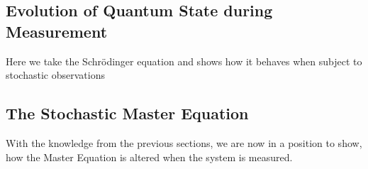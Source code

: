 \subsection{Evolution of Quantum State during Measurement}
Here we take the Schrödinger equation and shows how it behaves when subject to stochastic observations

\subsection{The Stochastic Master Equation}
With the knowledge from the previous sections, we are now in a position to show, how the Master Equation is altered when the system is measured.